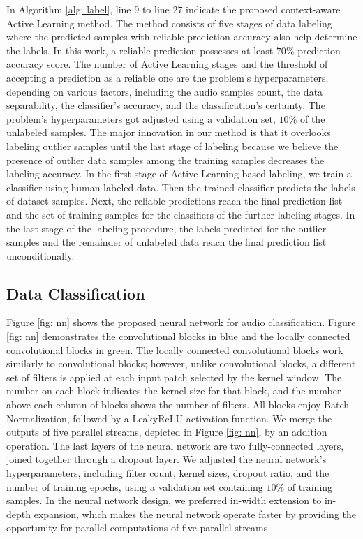 \documentclass{article}
\begin{document}
In Algorithm \ref{alg: label}, line $9$ to line $27$ indicate the proposed context-aware Active Learning method. The method consists of five stages of data labeling where the predicted samples with reliable prediction accuracy also help determine the labels. In this work, a reliable prediction possesses at least $70\%$ prediction accuracy score. The number of Active Learning stages and the threshold of accepting a prediction as a reliable one are the problem's hyperparameters, depending on various factors, including the audio samples count, the data separability, the classifier's accuracy, and the classification's certainty. The problem's hyperparameters got adjusted using a validation set, $10\%$ of the unlabeled samples. The major innovation in our method is that it overlooks labeling outlier samples until the last stage of labeling because we believe the presence of outlier data samples among the training samples decreases the labeling accuracy. In the first stage of Active Learning-based labeling, we train a classifier using human-labeled data. Then the trained classifier predicts the labels of dataset samples. Next, the reliable predictions reach the final prediction list and the set of training samples for the classifiers of the further labeling stages. In the last stage of the labeling procedure, the labels predicted for the outlier samples and the remainder of unlabeled data reach the final prediction list unconditionally.

\subsection{Data Classification}
Figure \ref{fig: nn} shows the proposed neural network for audio classification. Figure \ref{fig: nn} demonstrates the convolutional blocks in blue and the locally connected convolutional blocks in green. The locally connected convolutional blocks work similarly to convolutional blocks; however, unlike convolutional blocks, a different set of filters is applied at each input patch selected by the kernel window. The number on each block indicates the kernel size for that block, and the number above each column of blocks shows the number of filters. All blocks enjoy Batch Normalization, followed by a LeakyReLU activation function. We merge the outputs of five parallel streams, depicted in Figure \ref{fig: nn}, by an addition operation. The last layers of the neural network are two fully-connected layers, joined together through a dropout layer. We adjusted the neural network's hyperparameters, including filter count, kernel sizes, dropout ratio, and the number of training epochs, using a validation set containing $10\%$ of training samples. In the neural network design, we preferred in-width extension to in-depth expansion, which makes the neural network operate faster by providing the opportunity for parallel computations of five parallel streams.
\end{document}
